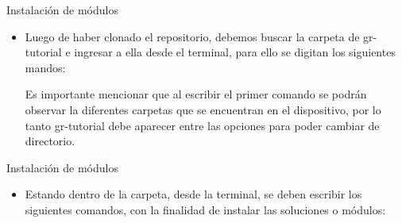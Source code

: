 \begin{frame}{Instalación de módulos}
\begin{itemize}
\item Luego de haber clonado el repositorio, debemos buscar la carpeta de gr-tutorial e ingresar a ella desde el terminal, para ello se digitan los siguientes mandos:


Es importante mencionar que al escribir el primer comando se podrán observar la diferentes carpetas que se encuentran en el dispositivo, por lo tanto gr-tutorial debe aparecer entre las opciones para poder cambiar de directorio. 
\end{itemize}
\end{frame}


\begin{frame}{Instalación de módulos}
\begin{itemize}
\item Estando dentro de la carpeta, desde la terminal, se deben escribir los siguientes comandos, con la finalidad de instalar las soluciones o módulos:


\end{itemize}
\end{frame}
